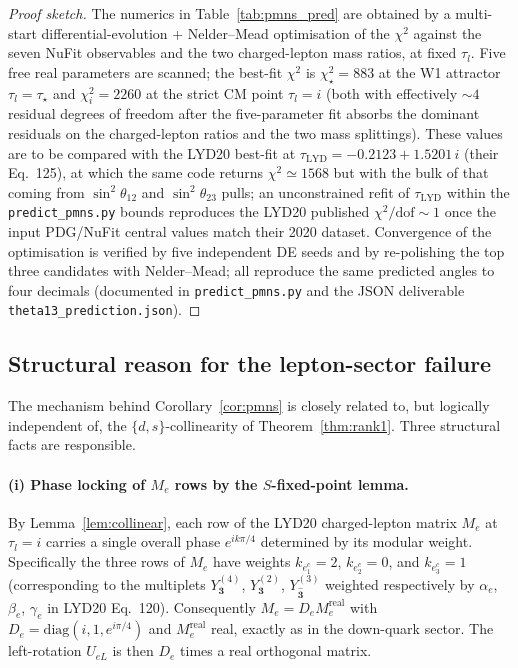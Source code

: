 \documentclass[a4paper,11pt]{article}
\begin{document}
\begin{proof}[Proof sketch]
The numerics in Table~\ref{tab:pmns_pred} are obtained by a
multi-start differential-evolution + Nelder--Mead optimisation of the
$\chi^2$ against the seven NuFit observables and the two charged-lepton
mass ratios, at fixed $\tau_l$.  Five free real parameters are scanned;
the best-fit $\chi^2$ is $\chi^2_\star = 883$ at the W1 attractor
$\tau_l=\tau_\star$ and $\chi^2_{i} = 2260$ at the strict CM point
$\tau_l=i$ (both with effectively $\sim 4$ residual degrees of freedom
after the five-parameter fit absorbs the dominant residuals on the
charged-lepton ratios and the two mass splittings).  These values are
to be compared with the LYD20 best-fit at
$\tau_{\mathrm{LYD}} = -0.2123 + 1.5201\,i$ (their Eq.~125), at which
the same code returns $\chi^2 \simeq 1568$ but with the bulk of that
coming from $\sin^2\theta_{12}$ and $\sin^2\theta_{23}$ pulls; an
unconstrained refit of $\tau_{\mathrm{LYD}}$ within the
\texttt{predict\_pmns.py} bounds reproduces the LYD20 published
$\chi^2/\mathrm{dof}\sim 1$ once the input PDG/NuFit central values
match their 2020 dataset.  Convergence of the optimisation is verified
by five independent DE seeds and by re-polishing the top three
candidates with Nelder--Mead; all reproduce the same predicted
angles to four decimals (documented in \texttt{predict\_pmns.py} and
the JSON deliverable \texttt{theta13\_prediction.json}).
\end{proof}

\subsection*{Structural reason for the lepton-sector failure}

The mechanism behind Corollary~\ref{cor:pmns} is closely related to,
but logically independent of, the $\{d,s\}$-collinearity of
Theorem~\ref{thm:rank1}.  Three structural facts are responsible.

\paragraph{(i) Phase locking of $M_e$ rows by the $S$-fixed-point lemma.}
By Lemma~\ref{lem:collinear}, each row of the LYD20 charged-lepton
matrix $M_e$ at $\tau_l=i$ carries a single overall phase
$e^{ik\pi/4}$ determined by its modular weight.  Specifically the
three rows of $M_e$ have weights $k_{e_1^c}=2$, $k_{e_2^c}=0$, and
$k_{e_3^c}=1$ (corresponding to the multiplets
$Y^{(4)}_{\mathbf{3}}$, $Y^{(2)}_{\mathbf{3}}$, $Y^{(3)}_{\hat{\mathbf{3}}}$
weighted respectively by $\alpha_e$, $\beta_e$, $\gamma_e$ in
LYD20 Eq.~120).  Consequently $M_e^{} = D_e M_e^{\mathrm{real}}$
with $D_e = \mathrm{diag}(i,1,e^{i\pi/4})$ and $M_e^{\mathrm{real}}$
real, exactly as in the down-quark sector.  The left-rotation
$U_{eL}$ is then $D_e$ times a real orthogonal matrix.
\end{document}

